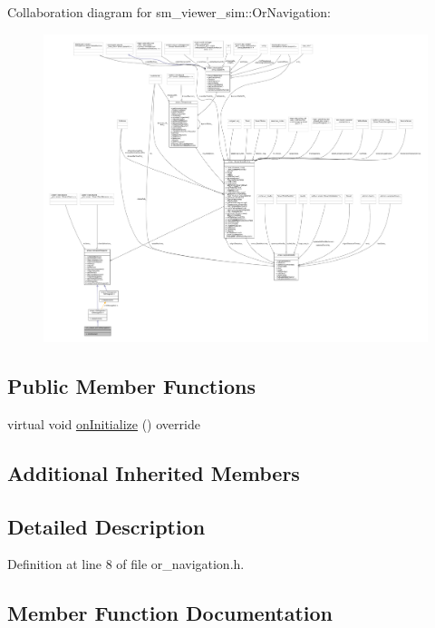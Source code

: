Collaboration diagram for sm\+\_\+viewer\+\_\+sim\+:\+:Or\+Navigation\+:
\nopagebreak
\begin{figure}[H]
\begin{center}
\leavevmode
\includegraphics[width=350pt]{classsm__viewer__sim_1_1OrNavigation__coll__graph}
\end{center}
\end{figure}
\subsection*{Public Member Functions}
\begin{DoxyCompactItemize}
\item 
virtual void \hyperlink{classsm__viewer__sim_1_1OrNavigation_a6f39ecbb3c1ad253c283588df860a8c4}{on\+Initialize} () override
\end{DoxyCompactItemize}
\subsection*{Additional Inherited Members}


\subsection{Detailed Description}


Definition at line 8 of file or\+\_\+navigation.\+h.



\subsection{Member Function Documentation}
\mbox{\label{classsm__viewer__sim_1_1OrNavigation_a6f39ecbb3c1ad253c283588df860a8c4}} 
